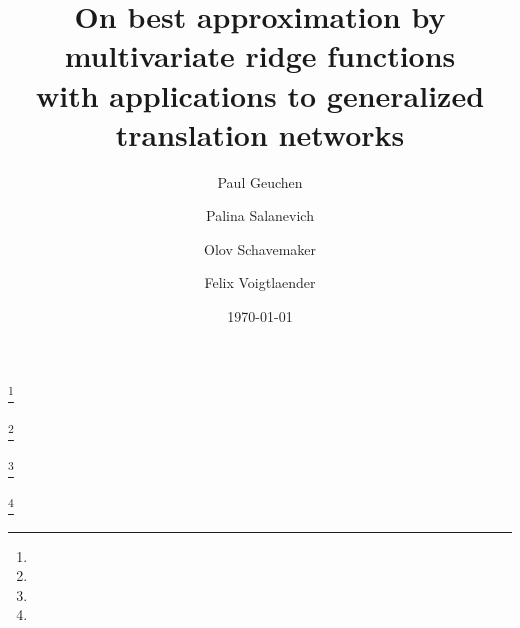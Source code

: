 \documentclass[10pt, reqno]{amsart}
\theoremstyle{plain}
\theoremstyle{definition} %
\theoremstyle{remark} %
\numberwithin{equation}{section}
\begin{document}
\allowdisplaybreaks



\title[On best approximation by multivariate ridge functions]{On best approximation by multivariate ridge functions \\ with applications to generalized translation networks}




\author{Paul Geuchen}
\address[P. Geuchen]{Mathematical Institute for Machine Learning and Data Science (MIDS),
Catholic University of Eichstätt--Ingolstadt (KU),
Auf der Schanz 49, 85049 Ingolstadt, Germany}
\thanks{}

\author{Palina Salanevich}
\address[P. Salanevich]{Mathematical Institute,
Utrecht University,
Budapestlaan 6,
3584 CD Utrecht,
Netherlands}
\thanks{}

\author{Olov Schavemaker}
\address[O. Schavemaker]{Mathematical Institute,
Utrecht University,
Budapestlaan 6,
3584 CD Utrecht,
Netherlands}
\thanks{}


\author{Felix Voigtlaender}\thanks{}
\address[F. Voigtlaender]{Mathematical Institute for Machine Learning and Data Science (MIDS),
Catholic University of Eichstätt--Ingolstadt (KU), Auf der Schanz 49, 85049 Ingolstadt, Germany}






\date{\today}
\end{document}
